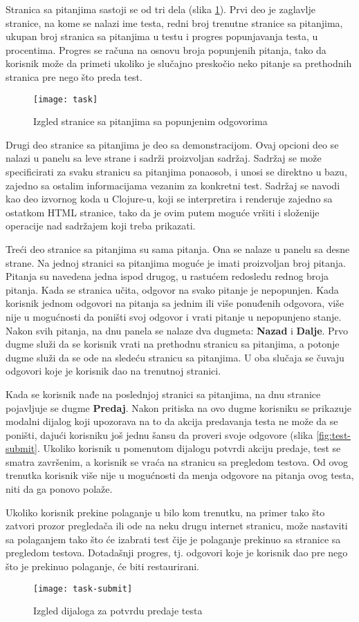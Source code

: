 Stranica sa pitanjima sastoji se od tri dela (slika \ref{fig:task}). Prvi deo je zaglavlje stranice, na kome se nalazi ime testa, redni broj trenutne stranice sa pitanjima, ukupan broj stranica sa pitanjima u testu i progres popunjavanja testa, u procentima. Progres se računa na osnovu broja popunjenih pitanja, tako da korisnik može da primeti ukoliko je slučajno preskočio neko pitanje sa prethodnih stranica pre nego što preda test.
\begin{figure}[h]
\texttt{[image: task]}
\caption{Izgled stranice sa pitanjima sa popunjenim odgovorima}
\label{fig:task}
\end{figure}

Drugi deo stranice sa pitanjima je deo sa demonstracijom. Ovaj opcioni deo se nalazi u panelu sa leve strane i sadrži proizvoljan sadržaj. Sadržaj se može specificirati za svaku stranicu sa pitanjima ponaosob, i unosi se direktno u bazu, zajedno sa ostalim informacijama vezanim za konkretni test. Sadržaj se navodi kao deo izvornog koda u Clojure-u, koji se interpretira i renderuje zajedno sa ostatkom HTML stranice, tako da je ovim putem moguće vršiti i složenije operacije nad sadržajem koji treba prikazati.

Treći deo stranice sa pitanjima su sama pitanja. Ona se nalaze u panelu sa desne strane. Na jednoj stranici sa pitanjima moguće je imati proizvoljan broj pitanja. Pitanja su navedena jedna ispod drugog, u rastućem redosledu rednog broja pitanja. Kada se stranica učita, odgovor na svako pitanje je nepopunjen. Kada korisnik jednom odgovori na pitanja sa jednim ili više ponuđenih odgovora, više nije u mogućnosti da poništi svoj odgovor i vrati pitanje u nepopunjeno stanje. Nakon svih pitanja, na dnu panela se nalaze dva dugmeta: \textbf{Nazad} i \textbf{Dalje}. Prvo dugme služi da se korisnik vrati na prethodnu stranicu sa pitanjima, a potonje dugme služi da se ode na sledeću stranicu sa pitanjima. U oba slučaja se čuvaju odgovori koje je korisnik dao na trenutnoj stranici.

Kada se korisnik nađe na poslednjoj stranici sa pitanjima, na dnu stranice pojavljuje se dugme \textbf{Predaj}. Nakon pritiska na ovo dugme korisniku se prikazuje modalni dijalog koji upozorava na to da akcija predavanja testa ne može da se poništi, dajući korisniku još jednu šansu da proveri svoje odgovore (slika \ref{fig:test-submit}. Ukoliko korisnik u pomenutom dijalogu potvrdi akciju predaje, test se smatra završenim, a korisnik se vraća na stranicu sa pregledom testova. Od ovog trenutka korisnik više nije u mogućnosti da menja odgovore na pitanja ovog testa, niti da ga ponovo polaže.

Ukoliko korisnik prekine polaganje u bilo kom trenutku, na primer tako što zatvori prozor pregledača ili ode na neku drugu internet stranicu, može nastaviti sa polaganjem tako što će izabrati test čije je polaganje prekinuo sa stranice sa pregledom testova. Dotadašnji progres, tj. odgovori koje je korisnik dao pre nego što je prekinuo polaganje, će biti restaurirani.
\begin{figure}[h]
\texttt{[image: task-submit]}
\caption{Izgled dijaloga za potvrdu predaje testa}
\label{fig:task-submit}
\end{figure}